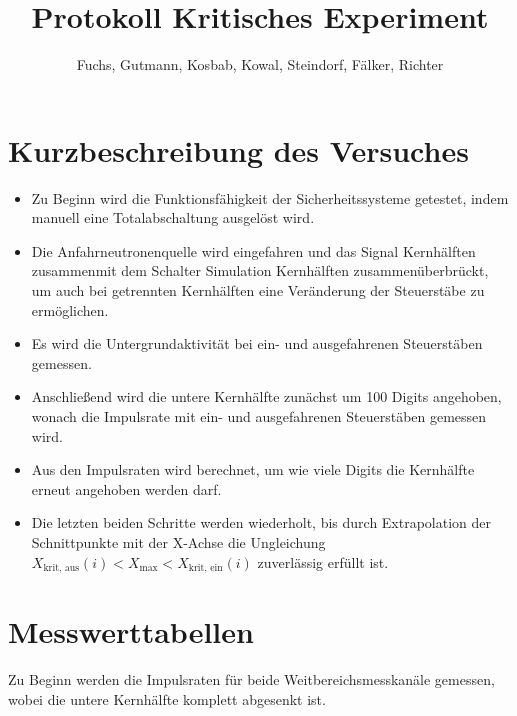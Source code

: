 \documentclass[12pt,german]{article}
\title{\vspace{-1.5cm}Protokoll Kritisches Experiment}
\author{Fuchs, Gutmann, Kosbab, Kowal, Steindorf, Fälker, Richter}
\begin{document}
    \maketitle
    \tableofcontents

    \section{Kurzbeschreibung des Versuches}
    \begin{itemize}
        \item Zu Beginn wird die Funktionsfähigkeit der Sicherheitssysteme getestet, indem manuell eine Totalabschaltung ausgelöst wird.
        \item Die Anfahrneutronenquelle wird eingefahren und das Signal \glqq Kernhälften zusammen\grqq mit dem Schalter \glqq Simulation Kernhälften zusammen\grqq überbrückt, um auch bei getrennten Kernhälften eine Veränderung der Steuerstäbe zu ermöglichen.
        \item Es wird die Untergrundaktivität bei ein- und ausgefahrenen Steuerstäben gemessen.
        \item Anschließend wird die untere Kernhälfte zunächst um 100 Digits angehoben, wonach die Impulsrate mit ein- und ausgefahrenen Steuerstäben gemessen wird.
        \item Aus den Impulsraten wird berechnet, um wie viele Digits die Kernhälfte erneut angehoben werden darf.
        \item Die letzten beiden Schritte werden wiederholt, bis durch Extrapolation der Schnittpunkte mit der X-Achse die Ungleichung \(X_\text{krit, aus}(i) < X_\text{max} < X_\text{krit, ein}(i)\) zuverlässig erfüllt ist.
    \end{itemize}

    \newpage

    \section{Messwerttabellen}

    Zu Beginn werden die Impulsraten für beide Weitbereichsmesskanäle gemessen, wobei die untere Kernhälfte komplett abgesenkt ist.
\end{document}
